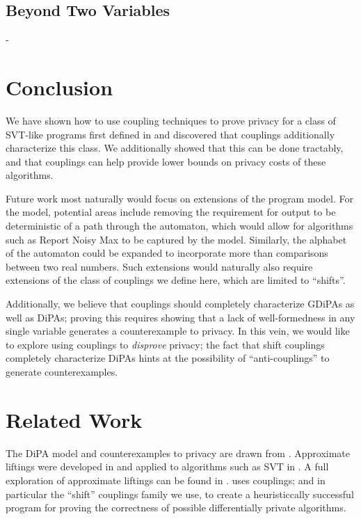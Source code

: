 \documentclass[12pt]{article}
\theoremstyle{definition}
\begin{document}
\subsection{Beyond Two Variables}

- 

\section{Conclusion}
We have shown how to use coupling techniques to prove privacy for a class of SVT-like programs first defined in \cite{chadhaLinearTimeDecidability2021} and discovered that couplings additionally characterize this class. We additionally showed that this can be done tractably, and that couplings can help provide lower bounds on privacy costs of these algorithms. 

Future work most naturally would focus on extensions of the program model. For the model, potential areas include removing the requirement for output to be deterministic of a path through the automaton, which would allow for algorithms such as Report Noisy Max to be captured by the model. Similarly, the alphabet of the automaton could be expanded to incorporate more than comparisons between two real numbers. 
Such extensions would naturally also require extensions of the class of couplings we define here, which are limited to ``shifts''. 

Additionally, we believe that couplings should completely characterize GDiPAs as well as DiPAs; proving this requires showing that a lack of well-formedness in any single variable generates a counterexample to privacy. 
In this vein, we would like to explore using couplings to \textit{disprove} privacy; the fact that shift couplings completely characterize DiPAs hints at the possibility of ``anti-couplings'' to generate counterexamples.

\section{Related Work}
The DiPA model and counterexamples to privacy are drawn from \cite{chadhaLinearTimeDecidability2021}. Approximate liftings were developed in \cite{bartheKopfOlmedo2012ProbabilisticRelationalReasoningforDifferentialPriv,BartheOlmedo2013} and applied to algorithms such as SVT in \cite{BartheEtAl2016}.
A full exploration of approximate liftings can be found in \cite{HsuThesis2017}. \cite{AlbarghouthiHsu2018} uses couplings; and in particular the ``shift'' couplings family we use, to create a heuristiccally successful program for proving the correctness of possible differentially private algorithms. 
\end{document}
